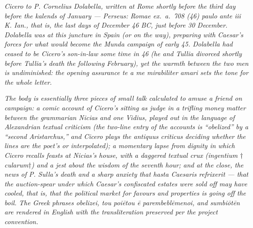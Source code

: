 
\textit{Cicero to P. Cornelius Dolabella, written at Rome
shortly before the third day before the kalends of
January --- Perseus: \textit{Romae ex.~a.~708 (46) paulo
ante iii K. Ian.}, that is, the last days of December 46
BC, just before 30 December. Dolabella was at this
juncture in Spain (or on the way), preparing with
Caesar's forces for what would become the Munda campaign
of early 45. Dolabella had ceased to be Cicero's
son-in-law some time in 46 (he and Tullia divorced
shortly before Tullia's death the following February),
yet the warmth between the two men is undiminished: the
opening assurance \textit{te a me mirabiliter amari} sets
the tone for the whole letter.}

\textit{The body is essentially three pieces of small talk
calculated to amuse a friend on campaign: a comic account
of Cicero's sitting as judge in a trifling money matter
between the grammarian Nicias and one Vidius, played out
in the language of Alexandrian textual criticism (the
two-line entry of the accounts is ``obelized'' by a
``second Aristarchus,'' and Cicero plays the
\textit{antiquus criticus} deciding whether the lines are
the poet's or interpolated); a momentary lapse from
dignity in which Cicero recalls feasts at Nicias's
house, with a daggered textual crux (\textit{ingentium
$\dagger$cularum$\dagger$}) and a jest about \textit{the
wisdom of the seventh hour}; and at the close, the news
of P. Sulla's death and a sharp anxiety that
\textit{hasta Caesaris refrixerit} --- that the auction-spear
under which Caesar's confiscated estates were sold off
may have cooled, that is, that the political market for
favours and properties is going off the boil. The
Greek phrases \textit{obelizei}, \textit{tou poiētou ē
parembeblēmenoi}, and \textit{sumbiōtēn} are rendered in
English with the transliteration preserved per the
project convention.}
